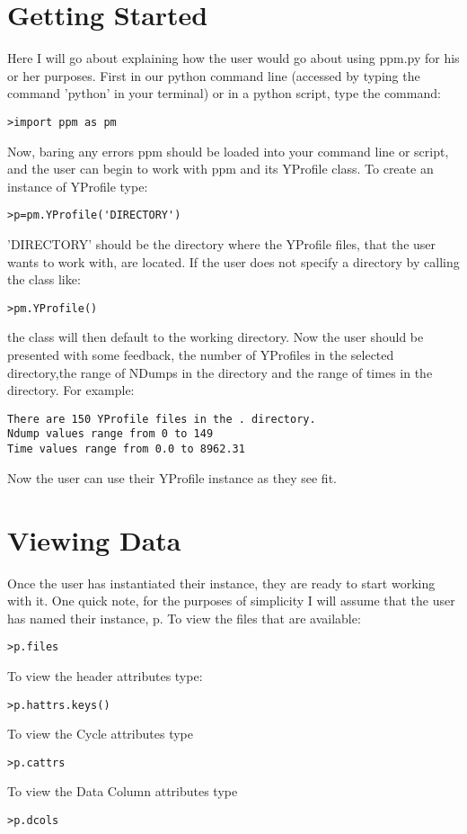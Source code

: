 \section{Getting Started}
Here I will go about explaining how the user would go about using ppm.py for his or her purposes.
First in our python command line (accessed by typing the command 'python' in your terminal) or in a python script,
type the command:
\begin{verbatim}
>import ppm as pm
\end{verbatim}
Now, baring any errors ppm should be loaded into your command line or script, and the user can begin
to work with ppm and its YProfile class. To create an instance of YProfile type:
\begin{verbatim}
>p=pm.YProfile('DIRECTORY')
\end{verbatim}
'DIRECTORY' should be the directory where the YProfile files, that the user wants
to work with, are located. If the user does not specify a directory by calling the class
like: 
\begin{verbatim}
>pm.YProfile()
\end{verbatim}
the class will then default to the working directory.
Now the user should be presented with some feedback, the number of YProfiles in the selected 
directory,the range of NDumps in the directory and the range of times in the directory. For example:
\begin{verbatim}
There are 150 YProfile files in the . directory.
Ndump values range from 0 to 149
Time values range from 0.0 to 8962.31
\end{verbatim}
Now the user can use their YProfile instance as they see fit.

\section{Viewing Data}
Once the user has instantiated their instance, they are ready to start working with it.
One quick note, for the purposes of simplicity I will assume that the user has named
their instance, p.
\newline
To view the files that are available:
\begin{verbatim}
>p.files
\end{verbatim}
To view the header attributes type:
\begin{verbatim}
>p.hattrs.keys()
\end{verbatim}


To view the Cycle attributes type
\begin{verbatim}
>p.cattrs
\end{verbatim}
To view the Data Column attributes type
\begin{verbatim}
>p.dcols
\end{verbatim}

